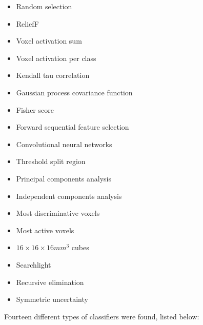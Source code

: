 \documentclass[pageno]{jpaper}
\begin{document}
    \begin{singlespace}
    \begin{multicols}{2}
            \begin{itemize}
                \item Random selection
                \item ReliefF
                \item Voxel activation sum
                \item Voxel activation per class
                \item Kendall tau correlation
                \item Gaussian process covariance function
                \item Fisher score
                \item Forward sequential feature selection
                \item Convolutional neural networks
                \item Threshold split region
                \item Principal components analysis
                \item Independent components analysis
                \item Most discriminative voxels
                \item Most active voxels
                \item $16\times16\times16 mm^3$ cubes
                \item Searchlight
                \item Recursive elimination
                \item Symmetric uncertainty
            \end{itemize}
        \end{multicols}
    \end{singlespace}
Fourteen different types of classifiers were found, listed below:
\end{document}

